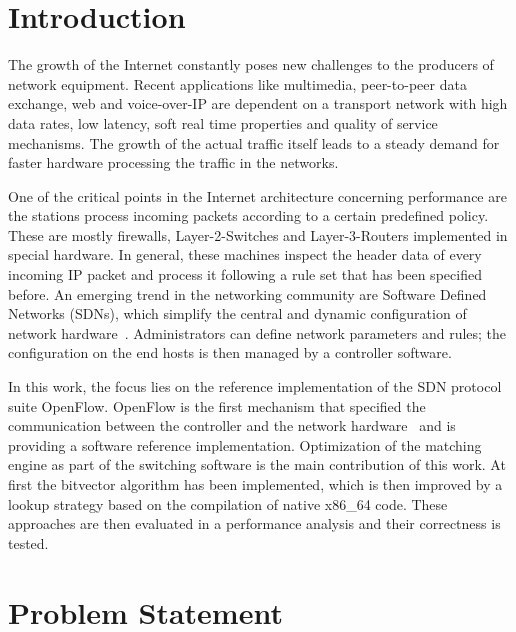 \documentclass[conference]{IEEEtran}
\begin{document}
\section{Introduction}
\label{sec:intro}
The growth of the Internet constantly poses new challenges to the producers of network equipment.
Recent applications like multimedia, peer-to-peer data exchange, web and voice-over-IP are dependent on a transport network with
high data rates, low latency, soft real time properties and quality of service mechanisms.
The growth of the actual traffic itself leads to a steady demand for faster hardware processing the traffic in the networks.

One of the critical points in the Internet architecture concerning performance 
are the stations process incoming packets according to a certain predefined policy.
These are mostly firewalls, Layer-2-Switches and Layer-3-Routers implemented in special hardware.
In general, these machines inspect the header data of every incoming IP packet and process it 
following a rule set that has been specified before.
An emerging trend in the networking community are Software Defined Networks (SDNs),
which simplify the central and dynamic configuration of network hardware~\cite{onf_whitepaper}.
Administrators can define network parameters and rules; the configuration 
on the end hosts is then managed by a controller software.

In this work, the focus lies on the reference implementation of the SDN protocol suite OpenFlow.
OpenFlow is the first mechanism that specified the communication between 
the controller and the network hardware~\cite{onf_whitepaper}
and is providing a software reference implementation.
Optimization of the matching engine as part of the switching software is the main contribution of this work.
At first the bitvector algorithm has been implemented, which is then improved by a lookup strategy
based on the compilation of native x86\_64 code.
These approaches are then evaluated in a performance analysis and their correctness is tested.

\section{Problem Statement}
\end{document}
